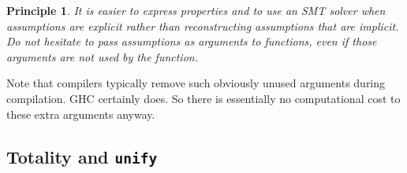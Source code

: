 \documentclass[sigconf]{acmart}
\newcommand{\tc}[1]{{\small\texttt{#1}}}
\newtheorem{principle}{Principle}
\begin{document}
\begin{principle}
  It is easier to express properties and to use an SMT solver when assumptions
  are explicit rather than reconstructing assumptions that are implicit.
  Do not hesitate to pass assumptions as arguments to functions, even if those
  arguments are not used by the function.
\end{principle}

Note that compilers typically remove such obviously unused arguments during
compilation. GHC certainly does. So there is essentially no computational cost to
these extra arguments anyway.

%
%
%

\subsection{Totality and \tc{unify}}
\label{checking-unify}
\end{document}
